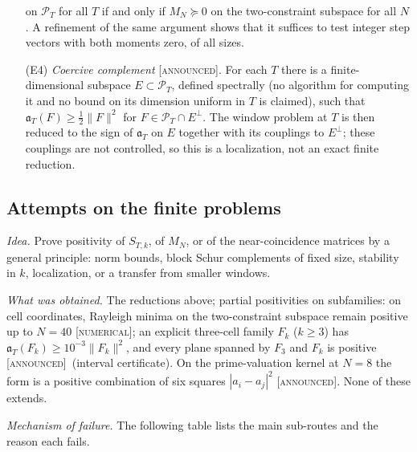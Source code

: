 \documentclass[11pt]{amsart}
\theoremstyle{definition}
\theoremstyle{remark}
\numberwithin{equation}{section}
\newcommand{\PT}{\mathcal{P}_T}                        %
\newcommand{\aT}{\mathfrak{a}_T}                       %
\newcommand{\stag}[1]{\textsc{[#1]}}
\newcommand{\NUM}{\stag{numerical}}
\newcommand{\ANNOUNCED}{\stag{announced}}
\newcommand{\entry}[1]{\par\smallskip\noindent\textit{#1.}\enspace}
\begin{document}
\begin{enumerate}
on $\PT$ for all $T$ if and only if $M_N\succeq0$ on the two-constraint subspace for all $N$. A refinement of the same
argument shows that it suffices to test integer step vectors with both moments zero, of all sizes.
\item[(E4)] \emph{Coercive complement} \ANNOUNCED. For each $T$ there is a finite-dimensional subspace $E\subset\PT$, defined
spectrally (no algorithm for computing it and no bound on its dimension uniform in $T$ is claimed), such that
$\aT(F)\ge\frac12\|F\|^2$ for $F\in\PT\cap E^\perp$. The window problem at $T$ is then reduced to the sign of $\aT$ on
$E$ together with its couplings to $E^\perp$; these couplings are not controlled, so this is a localization, not an
exact finite reduction.
\end{enumerate}

\subsection{Attempts on the finite problems}

\entry{Idea} Prove positivity of $S_{T,k}$, of $M_N$, or of the near-coincidence matrices by a general principle: norm
bounds, block Schur complements of fixed size, stability in $k$, localization, or a transfer from smaller windows.

\entry{What was obtained} The reductions above; partial positivities on subfamilies: on cell coordinates, Rayleigh
minima on the two-constraint subspace remain positive up to $N=40$ \NUM; an explicit three-cell family $F_k$ ($k\ge3$)
has $\aT(F_k)\ge10^{-3}\|F_k\|^2$, and every plane spanned by $F_3$ and $F_k$ is positive \ANNOUNCED\ (interval
certificate). On the prime-valuation kernel at $N=8$ the form is a positive combination of six squares
$|a_i-a_j|^2$ \ANNOUNCED. None of these extends.

\entry{Mechanism of failure} The following table lists the main sub-routes and the reason each fails.
\end{document}
